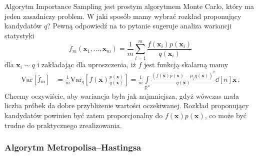 \documentclass{myclass}
\begin{document}
Algorytm Importance Sampling jest prostym algorytmem Monte Carlo, który ma jeden zasadniczy problem.
W jaki sposób mamy wybrać rozkład proponujący kandydatów \(q\)? Pewną odpowiedź na to pytanie
sugeruje analiza wariancji statystyki 
\begin{equation*}
    \overline{f}_m(\mathbf{x}_1,\ldots,\mathbf{x}_m) = \frac{1}{m}\sum_{i=1}^m \frac{f(\mathbf{x}_i)p(\mathbf{x}_i)}{q(\mathbf{x}_i)}
\end{equation*}
dla \(\mathbf{x}_i \sim q\) i zakładając dla uproszczenia, iż \(f\) jest funkcją skalarną mamy
\begin{equation*}
    \begin{split}
        \text{Var}[\overline{f}_m] &= \frac{1}{m}\text{Var}_q\left[f(\mathbf{x})\frac{p(\mathbf{x})}{q(\mathbf{x})}\right] = \frac{1}{m}\int\limits_{\mathbb{R}^n}\frac{(f(\mathbf{x})p(\mathbf{x}) - \mu_fq(\mathbf{x}))^2}{q(\mathbf{x})}\dd[n]{\mathbf{x}}\,.
    \end{split}
\end{equation*}
Chcemy oczywiście, aby wariancja była jak najmniejsza, gdyż wówczas mała liczba próbek da dobre
przybliżenie wartości oczekiwanej. Rozkład proponujący kandydatów powinien być zatem proporcjonalny
do \(f(\mathbf{x})p(\mathbf{x})\), co może być trudne do praktycznego zrealizowania.

\subsubsection{Algorytm Metropolisa--Hastingsa}
\end{document}
